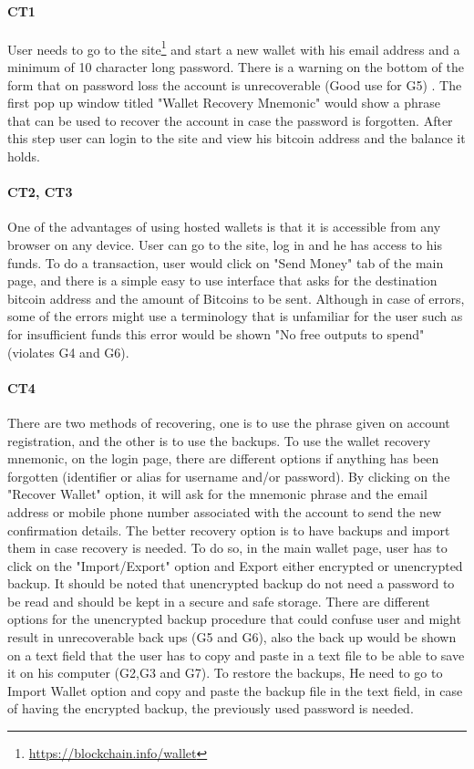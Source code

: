 \paragraph{CT1} User needs to go to the site\footnote{\url{https://blockchain.info/wallet}} and start a new wallet with his email address and a minimum of 10 character long password. There is a warning on the bottom of the form that on password loss the account is unrecoverable (Good use for G5) . The first pop up window titled "Wallet Recovery Mnemonic" would show a phrase that can be used to recover the account in case the password is forgotten. After this step user can login to the site and view his bitcoin address and the balance it holds.

\paragraph{CT2, CT3}
\label{hosted transaction}
One of the advantages of using hosted wallets is that it is accessible from any browser on any device. User can go to the site, log in and he has access to his funds. To do a transaction, user would click on "Send Money" tab of the main page, and there is a simple easy to use interface that asks for the destination bitcoin address and the amount of Bitcoins to be sent. Although in case of errors, some of the errors might use a terminology that is unfamiliar for the user such as for insufficient funds this error would be shown "No free outputs to spend" (violates G4 and G6).

\paragraph{CT4} There are two methods of recovering, one is to use the phrase given on account registration, and the other is to use the backups. To use the wallet recovery mnemonic, on the login page, there are different options if anything has been forgotten (identifier or alias for username and/or password). By clicking on the "Recover Wallet" option, it will ask for the mnemonic phrase and the email address or mobile phone number associated with the account to send the new confirmation details. The better recovery option is to have backups and import them in case recovery is needed. To do so, in the main wallet page, user has to click on the "Import/Export" option and Export either encrypted or unencrypted backup. It should be noted that unencrypted backup do not need a password to be read and should be kept in a secure and safe storage. There are different options for the unencrypted backup procedure that could confuse user and might result in unrecoverable back ups (G5 and G6), also the back up would be shown on a text field that the user has to copy and paste in a text file to be able to save it on his computer (G2,G3 and G7). To restore the backups, He need to go to Import Wallet option and copy and paste the backup file in the text field, in case of having the encrypted backup, the previously used password is needed.
